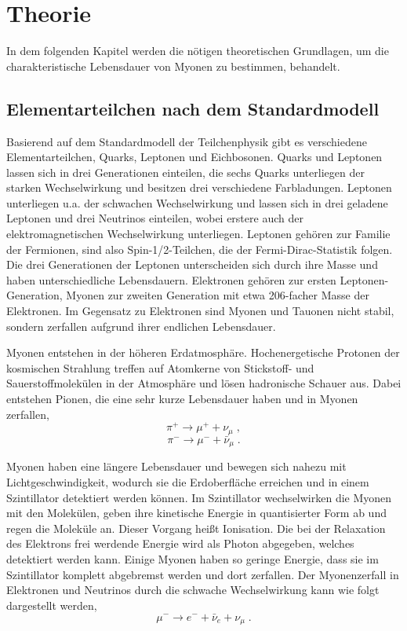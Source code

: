 \section{Theorie}

In dem folgenden Kapitel werden die nötigen theoretischen Grundlagen, um die charakteristische Lebensdauer von Myonen zu bestimmen, behandelt.

\subsection{Elementarteilchen nach dem Standardmodell}

Basierend auf dem Standardmodell der Teilchenphysik gibt es verschiedene Elementarteilchen, Quarks, Leptonen und Eichbosonen. Quarks und Leptonen lassen sich in drei Generationen einteilen, die sechs Quarks unterliegen der starken Wechselwirkung und besitzen drei verschiedene Farbladungen. Leptonen unterliegen u.a. der schwachen Wechselwirkung und lassen sich in drei geladene Leptonen und drei Neutrinos einteilen, wobei erstere auch der elektromagnetischen Wechselwirkung unterliegen. Leptonen gehören zur Familie der Fermionen, sind also Spin-1/2-Teilchen, die der Fermi-Dirac-Statistik folgen. Die drei Generationen der Leptonen unterscheiden sich durch ihre Masse und haben unterschiedliche Lebensdauern. Elektronen gehören zur ersten Leptonen-Generation, Myonen zur zweiten Generation mit etwa 206-facher Masse der Elektronen. Im Gegensatz zu Elektronen sind Myonen und Tauonen nicht stabil, sondern zerfallen aufgrund ihrer endlichen Lebensdauer.

Myonen entstehen in der höheren Erdatmosphäre. Hochenergetische Protonen der kosmischen Strahlung treffen auf Atomkerne von Stickstoff- und Sauerstoffmolekülen in der Atmosphäre und lösen hadronische Schauer aus. Dabei entstehen Pionen, die eine sehr kurze Lebensdauer haben und in Myonen zerfallen, $$\pi^+ \rightarrow \mu^+ + \nu_\mu\; ,$$ $$\pi^- \rightarrow \mu^- + \bar{\nu}_\mu\; .$$

Myonen haben eine längere Lebensdauer und bewegen sich nahezu mit Lichtgeschwindigkeit, wodurch sie die Erdoberfläche erreichen und in einem Szintillator detektiert werden können. Im Szintillator wechselwirken die Myonen mit den Molekülen, geben ihre kinetische Energie in quantisierter Form ab und regen die Moleküle an. Dieser Vorgang heißt Ionisation. Die bei der Relaxation des Elektrons frei werdende Energie wird als Photon abgegeben, welches detektiert werden kann. Einige Myonen haben so geringe Energie, dass sie im Szintillator komplett abgebremst werden und dort zerfallen. Der Myonenzerfall in Elektronen und Neutrinos durch die schwache Wechselwirkung kann wie folgt dargestellt werden, $$\mu^- \rightarrow e^- + \bar{\nu}_e + \nu_\mu\; . $$


